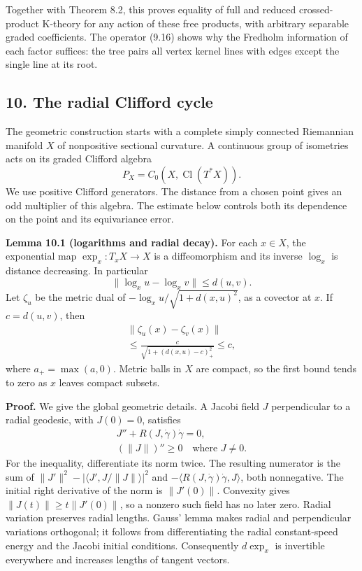 \documentclass[
  11pt,
]{article}
\begin{document}
Together with Theorem 8.2, this proves equality of full and reduced
crossed-product K-theory for any action of these free products, with
arbitrary separable graded coefficients. The operator (9.16) shows why
the Fredholm information of each factor suffices: the tree pairs all
vertex kernel lines with edges except the single line at its root.

\subsection{10. The radial Clifford
cycle}\label{the-radial-clifford-cycle}

The geometric construction starts with a complete simply connected
Riemannian manifold \(X\) of nonpositive sectional curvature. A
continuous group of isometries acts on its graded Clifford algebra \[
P_X=C_0(X,\operatorname{Cl}(T^*X)).
\tag{10.1}
\] We use positive Clifford generators. The distance from a chosen point
gives an odd multiplier of this algebra. The estimate below controls
both its dependence on the point and its equivariance error.

\textbf{Lemma 10.1 (logarithms and radial decay).} For each \(x\in X\),
the exponential map \(\exp_x:T_xX\to X\) is a diffeomorphism and its
inverse \(\log_x\) is distance decreasing. In particular \[
\|\log_xu-\log_xv\|\leq d(u,v).
\tag{10.2}
\] Let \(\zeta_u\) be the metric dual of \(-\log_xu/\sqrt{1+d(x,u)^2}\),
as a covector at \(x\). If \(c=d(u,v)\), then \[
\begin{gathered}
\|\zeta_u(x)-\zeta_v(x)\|\\
\leq\frac{c}{\sqrt{1+(d(x,u)-c)_+^2}}\leq c,
\end{gathered}
\tag{10.3}
\] where \(a_+=\max(a,0)\). Metric balls in \(X\) are compact, so the
first bound tends to zero as \(x\) leaves compact subsets.

\textbf{Proof.} We give the global geometric details. A Jacobi field
\(J\) perpendicular to a radial geodesic, with \(J(0)=0\), satisfies \[
\begin{gathered}
J''+R(J,\dot\gamma)\dot\gamma=0,\\
(\|J\|)''\geq0\quad\text{where }J\ne0.
\end{gathered}
\tag{10.4}
\] For the inequality, differentiate its norm twice. The resulting
numerator is the sum of \(\|J'\|^2-|\langle J',J/\|J\|\rangle|^2\) and
\(-\langle R(J,\dot\gamma)\dot\gamma,J\rangle\), both nonnegative. The
initial right derivative of the norm is \(\|J'(0)\|\). Convexity gives
\(\|J(t)\|\geq t\|J'(0)\|\), so a nonzero such field has no later zero.
Radial variation preserves radial lengths. Gauss' lemma makes radial and
perpendicular variations orthogonal; it follows from differentiating the
radial constant-speed energy and the Jacobi initial conditions.
Consequently \(d\exp_x\) is invertible everywhere and increases lengths
of tangent vectors.
\end{document}
